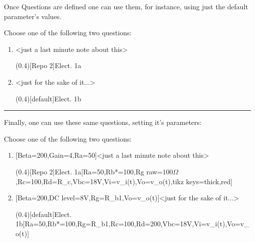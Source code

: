 \documentclass[10pt]{article}
\begin{document}


Once Questions are defined one can use them, for instance, using just the default parameter's values.

\begin{codestore}[QuestionDefault]
Choose one of the following two questions:

\begin{enumerate}
  \item {}<just a last minute note about this>\par
  \ftikzQuestion(0.4)[Repo 2]{Elect. 1a}
  
  \item {}<just for the sake of it...>\par
  \ftikzQuestion(0.4)[default]{Elect. 1b}
\end{enumerate}
\end{codestore}



\hrule\relax\vspace{0.5ex}



Finally, one can use these same questions, setting it's parameters:

\begin{codestore}[QuestionUse]
Choose one of the following two questions:

\begin{enumerate}
  \item {}[Beta=200,Gain=4,Ra=50\Omega]<just a last minute note about this>\par
  \ftikzQuestion(0.4)[Repo 2]{Elect. 1a}[Ra=50\Omega,Rb*=100\Omega,Rg raw=$100\Omega$,Rc=100\Omega,Rd=R_c,Vbc=18V,Vi=v_i(t),Vo=v_o(t),tikz keys={thick,red}] %
  
  \item {}[Beta=200,DC level=8V,Rg=R_{b1},Vo=v_o(t)]<just for the sake of it...>\par
  \ftikzQuestion(0.4)[default]{Elect. 1b}[Ra=50\Omega,Rb*=100\Omega,Rg=R_{b1},Rc=100\Omega,Rd=200\Omega,Vbc=18V,Vi=v_i(t),Vo=v_o(t)]
\end{enumerate}
\end{codestore}
\end{document}

